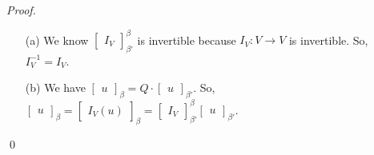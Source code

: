 \documentclass[12pt]{article}
\newenvironment{sol}
    {\emph{Proof.}
    }
    {
    \qed
    }
\begin{document}
\begin{sol} \text{ }
\begin{itemize}
    \item[(a)] We know $\begin{bmatrix}
    I_V
    \end{bmatrix}_{\beta '}^\beta$ is invertible because $I_V : V \to V$ is invertible. So, $I_V^{-1} = I_V$.
    
    \item[(b)] We have $\begin{bmatrix}
    u
    \end{bmatrix}_\beta = Q \cdot \begin{bmatrix}
    u
    \end{bmatrix}_{\beta '}$. So, $\begin{bmatrix}
    u
    \end{bmatrix}_\beta = \begin{bmatrix}
    I_V(u)
    \end{bmatrix}_\beta = \begin{bmatrix}
    I_V
    \end{bmatrix}_{\beta '}^\beta\begin{bmatrix}
    u
    \end{bmatrix}_{\beta '}$.
\end{itemize}
\end{sol}
\end{document}
